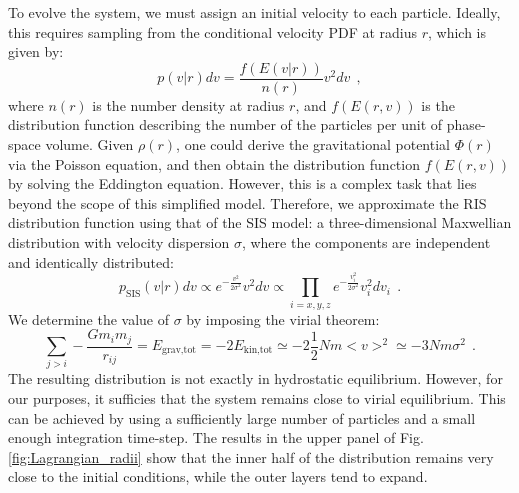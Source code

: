 \documentclass[fleqn,usenatbib]{mnras}
\begin{document}
To evolve the system, we must assign an initial velocity to each particle.
Ideally, this requires sampling from the conditional velocity PDF at radius $r$, which is given by:
\begin{equation}
    p(v|r)dv = \dfrac{f(E(v|r))}{n(r)} v^2 dv \:\: ,
    \label{eq:velocity_pdf}
\end{equation}
where $n(r)$ is the number density at radius $r$, and $f(E(r,v))$ is the distribution function describing the number of the particles per unit of phase-space volume.
Given $\rho(r)$, one could derive the gravitational potential $\Phi(r)$ via the Poisson equation, and then obtain the distribution function $f(E(r,v))$ by solving the Eddington equation.
However, this is a complex task that lies beyond the scope of this simplified model.
Therefore, we approximate the RIS distribution function using that of the SIS model: a three-dimensional Maxwellian distribution with velocity dispersion $\sigma$, where the components are independent and identically distributed:
\begin{equation}
    p_\text{SIS}(v|r)dv \propto e^{-\frac{v^2}{2 \sigma^2}} v^2 dv \propto 
    \prod_{i=x,y,z} e^{-\frac{v_i^2}{2 \sigma^2}} v_i^2 dv_i \:\: .
    \label{eq:sis_distribution_function}
\end{equation}
We determine the value of $\sigma$ by imposing the virial theorem:
{\fontsize{7.7pt}{7.7pt}\begin{equation}
    \sum_{j > i} - \dfrac{G m_i m_j}{r_{ij}} = E_\text{grav,tot} = -2E_\text{kin,tot} \simeq -2\dfrac{1}{2} N m <v>^2 \simeq -3 N m \sigma^2 \:\:. 
    \label{eq:sigma_virial}
\end{equation}}
The resulting distribution is not exactly in hydrostatic equilibrium.
However, for our purposes, it sufficies that the system remains close to virial equilibrium.
This can be achieved by using a sufficiently large number of particles and a small enough integration time-step.
The results in the upper panel of Fig. \ref{fig:Lagrangian_radii} show that the inner half of the distribution remains very close to the initial conditions, while the outer layers tend to expand.
\end{document}
